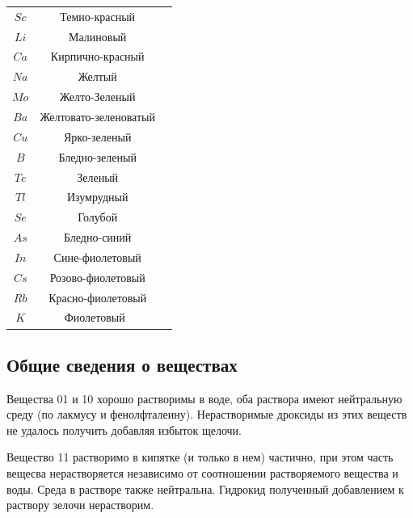 \documentclass[a4paper,14pt,notitlepage,twoside]{article}
\begin{document}
\begin{enumerate}
                    \begin{center}
                        \begin{tabular}{ccc}
                            $Sc$ & Темно-красный \\
                            $Li$ & Малиновый\\
                            $Ca$ & Кирпично-красный\\
                            $Na$ & Желтый\\
                            $Mo$ & Желто-Зеленый\\
                            $Ba$ & Желтовато-зеленоватый\\
                            $Cu$ & Ярко-зеленый\\
                            $B$ & Бледно-зеленый\\
                            $Te$ & Зеленый\\
                            $Tl$ & Изумрудный\\
                            $Se$ & Голубой\\
                            $As$ & Бледно-синий\\
                            $In$ & Сине-фиолетовый\\
                            $Cs$ & Розово-фиолетовый\\
                            $Rb$ & Красно-фиолетовый\\
                            $K$ & Фиолетовый\
                        \end{tabular}
            \end{center}


            \end{enumerate}
        \subsection{Общие сведения о веществах}
            Вещества 01 и 10 хорошо растворимы в воде, оба раствора имеют нейтральную среду
            (по лакмусу и фенолфталеину). Нерастворимые дроксиды из этих веществ не удалось получить
            добавляя избыток щелочи.

            Вещество 11 растворимо в кипятке (и только в нем) частично, при этом часть
            вещесва нерастворяется независимо от соотношении растворяемого вещества и воды.
            Среда в растворе также нейтральна. Гидрокид полученный добавлением к раствору зелочи нерастворим.
\end{document}
